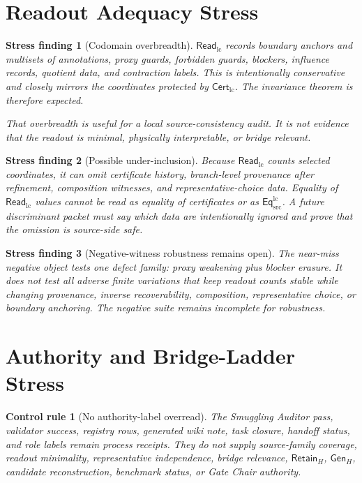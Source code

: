\documentclass[11pt]{article}
\newcommand{\EqLC}{\mathsf{Eq}_{\mathrm{src}}^{\mathrm{lc}}}
\newcommand{\CertLC}{\mathsf{Cert}_{\mathrm{lc}}}
\newcommand{\ReadLC}{\mathsf{Read}_{\mathrm{lc}}}
\newcommand{\RetainH}{\mathsf{Retain}_{H}}
\newcommand{\GenH}{\mathsf{Gen}_{H}}
\newtheorem{stressfinding}{Stress finding}
\newtheorem{controlrule}{Control rule}
\begin{document}
\section{Readout Adequacy Stress}

\begin{stressfinding}[Codomain overbreadth]
\(\ReadLC\) records boundary anchors and multisets of annotations,
proxy guards, forbidden guards, blockers, influence records, quotient
data, and contraction labels. This is intentionally conservative and
closely mirrors the coordinates protected by \(\CertLC\). The
invariance theorem is therefore expected.

That overbreadth is useful for a local source-consistency audit. It is
not evidence that the readout is minimal, physically interpretable, or
bridge relevant.
\end{stressfinding}

\begin{stressfinding}[Possible under-inclusion]
Because \(\ReadLC\) counts selected coordinates, it can omit
certificate history, branch-level provenance after refinement,
composition witnesses, and representative-choice data. Equality of
\(\ReadLC\) values cannot be read as equality of certificates or as
\(\EqLC\). A future discriminant packet must say which data are
intentionally ignored and prove that the omission is source-side safe.
\end{stressfinding}

\begin{stressfinding}[Negative-witness robustness remains open]
The near-miss negative object tests one defect family: proxy weakening
plus blocker erasure. It does not test all adverse finite variations
that keep readout counts stable while changing provenance, inverse
recoverability, composition, representative choice, or boundary
anchoring. The negative suite remains incomplete for robustness.
\end{stressfinding}

\section{Authority and Bridge-Ladder Stress}

\begin{controlrule}[No authority-label overread]
The Smuggling Auditor pass, validator success, registry rows, generated
wiki note, task closure, handoff status, and role labels remain process
receipts. They do not supply source-family coverage, readout
minimality, representative independence, bridge relevance,
\(\RetainH\), \(\GenH\), candidate reconstruction, benchmark status, or
Gate Chair authority.
\end{controlrule}
\end{document}
